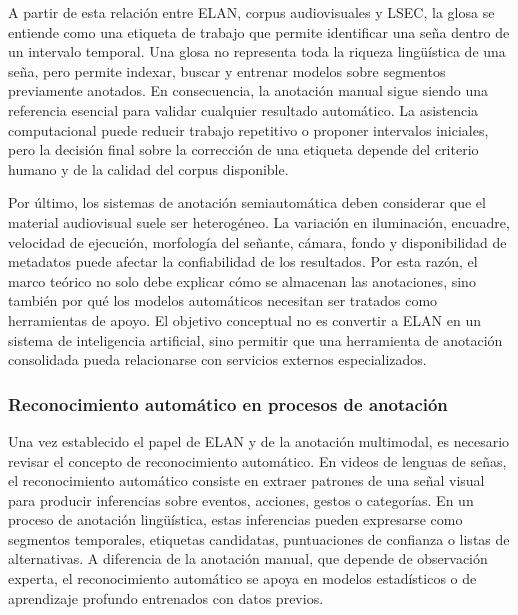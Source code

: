 A partir de esta relación entre ELAN, corpus audiovisuales y LSEC, la glosa se entiende como una etiqueta de trabajo que permite identificar una seña dentro de un intervalo temporal. Una glosa no representa toda la riqueza lingüística de una seña, pero permite indexar, buscar y entrenar modelos sobre segmentos previamente anotados. En consecuencia, la anotación manual sigue siendo una referencia esencial para validar cualquier resultado automático. La asistencia computacional puede reducir trabajo repetitivo o proponer intervalos iniciales, pero la decisión final sobre la corrección de una etiqueta depende del criterio humano y de la calidad del corpus disponible.

Por último, los sistemas de anotación semiautomática deben considerar que el material audiovisual suele ser heterogéneo. La variación en iluminación, encuadre, velocidad de ejecución, morfología del señante, cámara, fondo y disponibilidad de metadatos puede afectar la confiabilidad de los resultados. Por esta razón, el marco teórico no solo debe explicar cómo se almacenan las anotaciones, sino también por qué los modelos automáticos necesitan ser tratados como herramientas de apoyo. El objetivo conceptual no es convertir a ELAN en un sistema de inteligencia artificial, sino permitir que una herramienta de anotación consolidada pueda relacionarse con servicios externos especializados.


\subsubsection{Reconocimiento automático en procesos de anotación}

Una vez establecido el papel de ELAN y de la anotación multimodal, es necesario revisar el concepto de reconocimiento automático. En videos de lenguas de señas, el reconocimiento automático consiste en extraer patrones de una señal visual para producir inferencias sobre eventos, acciones, gestos o categorías. En un proceso de anotación lingüística, estas inferencias pueden expresarse como segmentos temporales, etiquetas candidatas, puntuaciones de confianza o listas de alternativas. A diferencia de la anotación manual, que depende de observación experta, el reconocimiento automático se apoya en modelos estadísticos o de aprendizaje profundo entrenados con datos previos.

